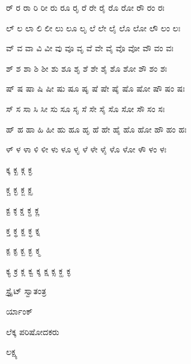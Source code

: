 \documentclass[10pt,oneside]{book}
\begin{document}
\begin{spacing}{1.6}
ರ್ ರ ರಾ ರಿ ರೀ ರು ರೂ ರೃ ರೆ ರೇ ರೈ ರೊ ರೋ ರೌ ರಂ ರಃ

ಲ್ ಲ ಲಾ ಲಿ ಲೀ ಲು ಲೂ ಲೃ ಲೆ ಲೇ ಲೈ ಲೊ ಲೋ ಲೌ ಲಂ ಲಃ

ವ್ ವ ವಾ ವಿ ವೀ ವು ವೂ ವೃ ವೆ ವೇ ವೈ ವೊ ವೋ ವೌ ವಂ ವಃ

ಶ್ ಶ ಶಾ ಶಿ ಶೀ ಶು ಶೂ ಶೃ ಶೆ ಶೇ ಶೈ ಶೊ ಶೋ ಶೌ ಶಂ ಶಃ

ಷ್ ಷ ಷಾ ಷಿ ಷೀ ಷು ಷೂ ಷೃ ಷೆ ಷೇ ಷೈ ಷೊ ಷೋ ಷೌ ಷಂ ಷಃ

ಸ್ ಸ ಸಾ ಸಿ ಸೀ ಸು ಸೂ ಸೃ ಸೆ ಸೇ ಸೈ ಸೊ ಸೋ ಸೌ ಸಂ ಸಃ

ಹ್ ಹ ಹಾ ಹಿ ಹೀ ಹು ಹೂ ಹೃ ಹೆ ಹೇ ಹೈ ಹೊ ಹೋ ಹೌ ಹಂ ಹಃ

ಳ್ ಳ ಳಾ ಳಿ ಳೀ ಳು ಳೂ ಳೃ ಳೆ ಳೇ ಳೈ ಳೊ ಳೋ ಳೌ ಳಂ ಳಃ

ಕ್ಕ ಕ್ಖ ಕ್ಗ ಕ್ಘ

ಕ್ಚ ಕ್ಛ ಕ್ಜ ಕ್ಝ

ಕ್ಟ ಕ್ಠ ಕ್ಡ ಕ್ಢ ಕ್ಣ

ಕ್ತ ಕ್ಥ ಕ್ದ ಕ್ಧ ಕ್ನ

ಕ್ಪ ಕ್ಫ ಕ್ಬ ಕ್ಭ ಕ್ಮ

ಕ್ಯ ಕ್ರ ಕ್ಲ ಕ್ವ ಕ್ಶ ಕ್ಷ ಕ್ಸ ಕ್ಹ ಕ್ಳ

ಸ್ಟ್ರೈಟ್ ಸ್ವಾತಂತ್ರ

ರ್ಯಾಂಕ್

ಲೆಕ್ಕ ಪರಿಷೋದಕರು

ಲಕ್ಷ್ಯ
\end{spacing}
\end{document}
